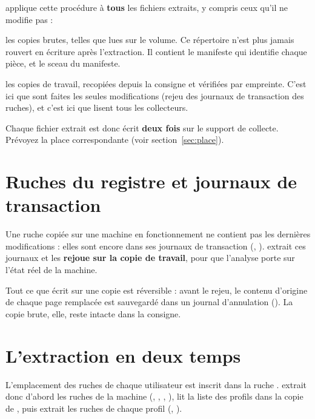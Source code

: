 \documentclass[11pt,a4paper,oneside]{report}
\begin{document}
\wac{} applique cette procédure à \textbf{tous} les fichiers extraits, y compris
ceux qu'il ne modifie pas :

\begin{description}[style=nextline,leftmargin=1.2em]
  \item[\fichier{exhibits/}] les copies brutes, telles que lues sur le volume. Ce
        répertoire n'est plus jamais rouvert en écriture après l'extraction. Il
        contient le manifeste qui identifie chaque pièce, et le sceau du
        manifeste.
  \item[\fichier{working/}] les copies de travail, recopiées depuis la consigne
        et vérifiées par empreinte. C'est ici que sont faites les seules
        modifications (rejeu des journaux de transaction des ruches), et c'est ici
        que lisent tous les collecteurs.
\end{description}

\begin{note}
Chaque fichier extrait est donc écrit \textbf{deux fois} sur le support de
collecte. Prévoyez la place correspondante (voir
section~\ref{sec:place}).
\end{note}

\section{Ruches du registre et journaux de transaction}

Une ruche copiée sur une machine en fonctionnement ne contient pas les dernières
modifications : elles sont encore dans ses journaux de transaction
(, ). \wac{} extrait ces journaux et les
\textbf{rejoue sur la copie de travail}, pour que l'analyse porte sur l'état réel
de la machine.

Tout ce que \wac{} écrit sur une copie est réversible : avant le rejeu, le contenu
d'origine de chaque page remplacée est sauvegardé dans un journal d'annulation
(). La copie brute, elle, reste intacte dans la consigne.

\section{L'extraction en deux temps}

L'emplacement des ruches de chaque utilisateur est inscrit dans la ruche
. \wac{} extrait donc d'abord les ruches de la machine
(, , , ), lit la
liste des profils dans la copie de , puis extrait les ruches de
chaque profil (, ).
\end{document}
